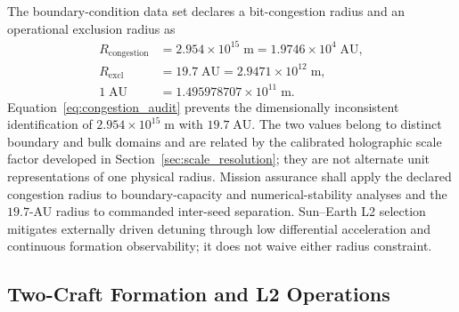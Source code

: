 \documentclass[10pt,twocolumn]{IEEEtran}
\begin{document}
The boundary-condition data set declares a bit-congestion radius and an operational exclusion radius as
\begin{equation}
\begin{aligned}
R_{\mathrm{congestion}} &= 2.954\times10^{15}\;\mathrm{m}
=1.9746\times10^{4}\;\mathrm{AU}, \\
R_{\mathrm{excl}} &= 19.7\;\mathrm{AU}
=2.9471\times10^{12}\;\mathrm{m}, \\
1\;\mathrm{AU} &= 1.495978707\times10^{11}\;\mathrm{m}.
\end{aligned}
\label{eq:congestion_audit}
\end{equation}
Equation~\eqref{eq:congestion_audit} prevents the dimensionally inconsistent identification of $2.954\times10^{15}\;\mathrm{m}$ with $19.7\;\mathrm{AU}$.  The two values belong to distinct boundary and bulk domains and are related by the calibrated holographic scale factor developed in Section~\ref{sec:scale_resolution}; they are not alternate unit representations of one physical radius.  Mission assurance shall apply the declared congestion radius to boundary-capacity and numerical-stability analyses and the $19.7$-AU radius to commanded inter-seed separation. Sun--Earth L2 selection mitigates externally driven detuning through low differential acceleration and continuous formation observability; it does not waive either radius constraint.

\subsection{Two-Craft Formation and L2 Operations}
\end{document}
